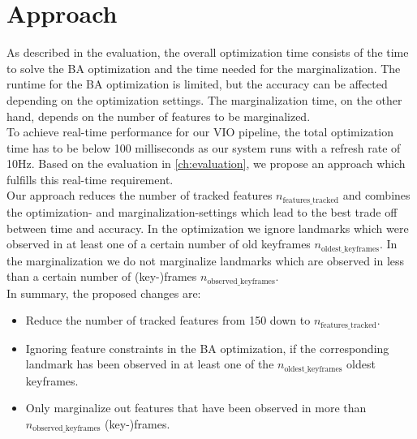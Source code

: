 \chapter{Approach} 
\label{ch:approach}

As described in the evaluation, the overall optimization time consists of the 
time to solve the \ac{BA} optimization and the time needed for the 
marginalization. The runtime for the \ac{BA} optimization is limited, but the 
accuracy can be affected depending on the optimization settings. The 
marginalization time, on the other hand, depends on the number of features to be 
marginalized. \\

To achieve real-time performance for our \ac{VIO} pipeline, the total 
optimization time has to be below 100 milliseconds as our system runs with a 
refresh rate of 10Hz. Based on the evaluation in \autoref{ch:evaluation}, we 
propose an approach which fulfills this real-time requirement. \\

Our approach reduces the number of tracked features 
$n_{\text{features\_tracked}}$ and combines the optimization- and 
marginalization-settings which lead to the best trade off between time and 
accuracy. In the optimization we ignore landmarks which were observed in at 
least one of a certain number of old keyframes $n_{\text{oldest\_keyframes}}$. 
In the marginalization we do not marginalize landmarks which are observed in 
less than a certain number of (key-)frames $n_{\text{observed\_keyframes}}$. \\

In summary, the proposed changes are: 
\begin{itemize}
  \item Reduce the number of tracked features from 150 down to 
$n_{\text{features\_tracked}}$.
  \item Ignoring feature constraints in the \ac{BA} optimization, if the 
corresponding landmark has been observed in at least one of the 
$n_{\text{oldest\_keyframes}}$ oldest keyframes.
  \item Only marginalize out features that have been observed in more than 
$n_{\text{observed\_keyframes}}$ (key-)frames. 
\end{itemize}

